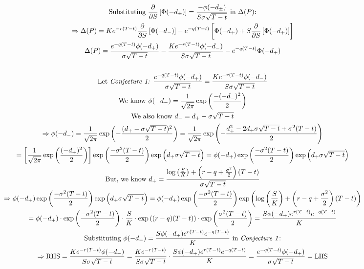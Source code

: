 \documentclass[letterpaper,10pt]{article}
\newcommand{\partiald}[2]{\frac{\partial #1}{\partial #2}}
\begin{document}
\begin{gather*}
				\text{Substituting } \partiald{}{S} \left[\Phi(-d_{\pm}) \right] = \frac{- \phi(-d_{\pm})}{S\sigma\sqrt{T-t}} \text{ in } \Delta(P) \text{:} \\
				\Rightarrow \Delta(P) = Ke^{-r(T-t)}\partiald{}{S}\left[\Phi(-d_{-})\right] - e^{-q(T-t)}\left[\Phi(-d_{+}) + S\partiald{}{S}\left[\Phi(-d_{+}) \right] \right] \\
				\Delta(P) = \frac{e^{-q(T-t)} \phi(-d_{+})}{\sigma \sqrt{T-t}} - \frac{K e^{-r(T-t)} \phi(-d_{-})}{S\sigma\sqrt{T-t}} - e^{-q(T-t)} \Phi(-d_{+}) \\
				\\
				\text{Let \textit{Conjecture 1: }} \frac{e^{-q(T-t)} \phi(-d_{+})}{\sigma \sqrt{T-t}} = \frac{Ke^{-r(T-t)}\phi(-d_{-})}{S \sigma \sqrt{T-t}} \\
				\text{We know } \phi(-d_{-}) = \frac{1}{\sqrt{2\pi}} \exp{\left(\frac{-(-d_{-})^2}{2}\right)} \\
				\text{We also know } d_{-} = d_{+} - \sigma \sqrt{T-t} \\
				\Rightarrow \phi(-d_{-}) = \frac{1}{\sqrt{2\pi}} \exp{\left(- \frac{(d_+ - \sigma\sqrt{T-t})^2}{2} \right)} = \frac{1}{\sqrt{2\pi}}\exp{\left( - \frac{d_+^2 -2d_+\sigma\sqrt{T-t} + \sigma^2(T-t)}{2}  \right)} \\
				= \left[\frac{1}{\sqrt{2\pi}} \exp{\left( \frac{(-d_+)^2}{2} \right)}\right] \exp{\left( \frac{-\sigma^2 (T-t)}{2} \right)} \exp{\left( d_+ \sigma \sqrt{T-t} \right)} = \phi(-d_+) \exp{\left( \frac{-\sigma^2 (T-t)}{2} \right)} \exp{\left( d_+ \sigma \sqrt{T-t} \right)} \\
				\text{But, we know } d_+ = \frac{\log \left(\frac{S}{K} \right) + \left(r - q + \frac{\sigma^2}{2} \right) (T-t)}{\sigma \sqrt{T-t}} \\
				\Rightarrow \phi(-d_+) \exp{\left( \frac{-\sigma^2 (T-t)}{2} \right)} \exp{\left( d_+ \sigma \sqrt{T-t} \right)} = \phi(-d_+) \exp{\left( \frac{-\sigma^2 (T-t)}{2} \right)} \exp{\left( \log \left(\frac{S}{K} \right) + \left(r - q + \frac{\sigma^2}{2} \right) (T-t) \right)} \\
				= \phi(-d_+) \cdot \exp{\left( \frac{-\sigma^2(T-t)}{2} \right)} \cdot \frac{S}{K} \cdot \exp{ \left( (r-q)(T-t) \right)} \cdot \exp{\left( \frac{\sigma^2(T-t)}{2} \right)} = \frac{S\phi(-d_+)e^{r(T-t)} e^{-q(T-t)}}{K} \\
				\text{Substituting } \phi(-d_-) = \frac{S\phi(-d_+)e^{r(T-t)} e^{-q(T-t)}}{K} \text{ in \textit{Conjecture 1}:} \\
				\Rightarrow \text{RHS} = \frac{Ke^{-r(T-t)}\phi(-d_{-})}{S \sigma \sqrt{T-t}} = \frac{Ke^{-r(T-t)}}{S \sigma \sqrt{T-t}} \cdot \frac{S\phi(-d_+) e^{r(T-t)} e^{-q(T-t)}}{K} = \frac{e^{-q(T-t)} \phi(-d_+)}{\sigma \sqrt{T-t}} = \text{LHS} \\

\end{gather*}
\end{document}
